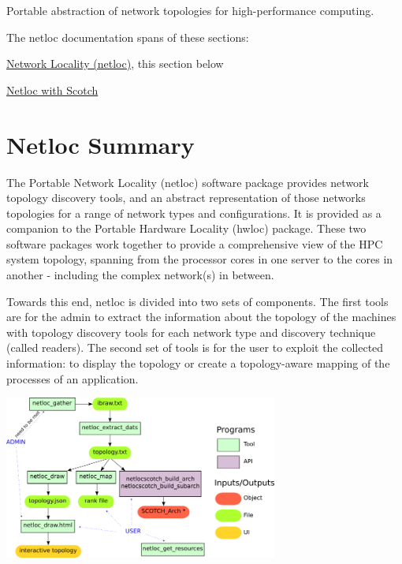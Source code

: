

Portable abstraction of network topologies for high-\/performance computing.

The netloc documentation spans of these sections\+: 
\begin{DoxyItemize}
\item \hyperlink{a00396}{Network Locality (netloc)}, this section below  
\item \hyperlink{a00397}{Netloc with Scotch}  
\end{DoxyItemize}

 \hypertarget{a00396_netloc_summary}{}\section{Netloc Summary}\label{a00396_netloc_summary}
The Portable Network Locality (netloc) software package provides network topology discovery tools, and an abstract representation of those networks topologies for a range of network types and configurations. It is provided as a companion to the Portable Hardware Locality (hwloc) package. These two software packages work together to provide a comprehensive view of the H\+PC system topology, spanning from the processor cores in one server to the cores in another -\/ including the complex network(s) in between.

Towards this end, netloc is divided into two sets of components. The first tools are for the admin to extract the information about the topology of the machines with topology discovery tools for each network type and discovery technique (called readers). The second set of tools is for the user to exploit the collected information\+: to display the topology or create a topology-\/aware mapping of the processes of an application.

 
\begin{DoxyImageNoCaption}
  \mbox{\includegraphics[width=9cm]{netloc_design.png}}
\end{DoxyImageNoCaption}


